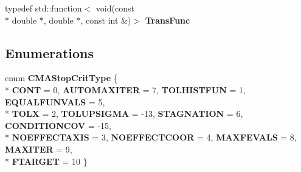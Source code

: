 \begin{DoxyCompactItemize}
\item 
\hypertarget{namespacelibcmaes_a05b1e5e516cec9483ccdb964284ef82c}{typedef std\-::function$<$ void(const \\*
double $\ast$, double $\ast$, const int \&)$>$ {\bfseries Trans\-Func}}\label{namespacelibcmaes_a05b1e5e516cec9483ccdb964284ef82c}

\end{DoxyCompactItemize}
\subsection*{Enumerations}
\begin{DoxyCompactItemize}
\item 
enum {\bfseries C\-M\-A\-Stop\-Crit\-Type} \{ \\*
{\bfseries C\-O\-N\-T} = 0, 
{\bfseries A\-U\-T\-O\-M\-A\-X\-I\-T\-E\-R} = 7, 
{\bfseries T\-O\-L\-H\-I\-S\-T\-F\-U\-N} = 1, 
{\bfseries E\-Q\-U\-A\-L\-F\-U\-N\-V\-A\-L\-S} = 5, 
\\*
{\bfseries T\-O\-L\-X} = 2, 
{\bfseries T\-O\-L\-U\-P\-S\-I\-G\-M\-A} = -\/13, 
{\bfseries S\-T\-A\-G\-N\-A\-T\-I\-O\-N} = 6, 
{\bfseries C\-O\-N\-D\-I\-T\-I\-O\-N\-C\-O\-V} = -\/15, 
\\*
{\bfseries N\-O\-E\-F\-F\-E\-C\-T\-A\-X\-I\-S} = 3, 
{\bfseries N\-O\-E\-F\-F\-E\-C\-T\-C\-O\-O\-R} = 4, 
{\bfseries M\-A\-X\-F\-E\-V\-A\-L\-S} = 8, 
{\bfseries M\-A\-X\-I\-T\-E\-R} = 9, 
\\*
{\bfseries F\-T\-A\-R\-G\-E\-T} = 10
 \}
\end{DoxyCompactItemize}
